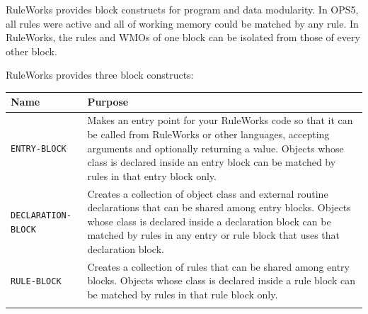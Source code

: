 RuleWorks provides block constructs for program and data
modularity. In OPS5, all rules were active and all of working memory
could be matched by any rule. In RuleWorks, the rules and WMOs of one
block can be isolated from those of every other block.

RuleWorks provides three block constructs:

\begin{tabularx}{\columnwidth}{lX}
    \toprule
    Name & Purpose \\
    \midrule
    \tt{ENTRY-BLOCK} & Makes an entry point
                       for your RuleWorks   
                       code so that it can  
                       be called from       
                       RuleWorks or other   
                       languages, accepting 
                       arguments and        
                       optionally returning 
                       a value. Objects     
                       whose class is       
                       declared inside an   
                       entry block can be   
                       matched by rules in  
                       that entry block     
                       only. \\\addlinespace
    \tt{DECLARATION-BLOCK} & Creates a collection
                             of object class and  
                             external routine     
                             declarations that    
                             can be shared among  
                             entry blocks.        
                             Objects whose class  
                             is declared inside a 
                             declaration block    
                             can be matched by    
                             rules in any entry   
                             or rule block that   
                             uses that            
                             declaration block. \\\addlinespace
    \tt{RULE-BLOCK} & Creates a collection
                      of rules that can be 
                      shared among entry   
                      blocks. Objects      
                      whose class is       
                      declared inside a    
                      rule block can be    
                      matched by rules in  
                      that rule block      
                      only. \\\addlinespace
    \bottomrule
  \end{tabularx}



